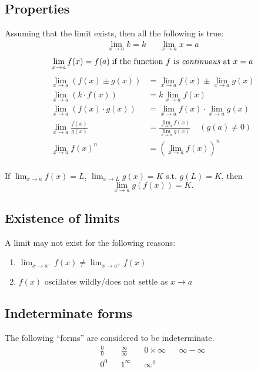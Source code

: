 \documentclass[main.tex]{subfiles}
\begin{document}
\begin{multicols}{2}
	\subsection*{Properties}
	Assuming that the limit exists, then all the following is true:
	\begin{align*}
		\lim_{x \to a} k = k && \lim_{x \to a} x = a
	\end{align*}
	\begin{equation*}
		\lim_{x \to a} f(x) = f(a) \; \text{if the function \(f\) is \emph{continuous} at \(x = a\)}
	\end{equation*}
	\begin{align*}
		\lim_{x \to a}(f(x) \pm g(x)) &= \lim_{x \to a}f(x) \pm \lim_{x \to a}g(x) \\
		\lim_{x \to a}(k \cdot f(x)) &= k \lim_{x \to a}f(x) \\
		\lim_{x \to a}(f(x) \cdot g(x)) &= \lim_{x \to a}{f(x)} \cdot \lim_{x \to a}{g(x)} \\
		\lim_{x \to a} \frac{f(x)}{g(x)} &= \frac{\lim_{x \to a} f(x)}{\lim_{x \to a} g(x)} \;\;\;\; (g(a) \neq 0) \\
		\lim_{x \to a}f(x)^n &= \left( \lim_{x \to a}{f(x)}\right)^n \\
	\end{align*}

	If \(\displaystyle \lim_{x \to a} f(x) = L\), \(\displaystyle \lim_{x \to L} g(x) = K\) s.t. \(g(L) = K\), then
	\begin{equation*}
		\lim_{x \to a} g(f(x)) = K.
	\end{equation*}


	\subsection*{Existence of limits}
	A limit may not exist for the following reasons:
	\begin{enumerate}
		\item \(\lim_{x \to a^{-}}{f(x)} \neq \lim_{x \to a^{+}}{f(x)}\)
		\item \(f(x)\) oscillates wildly/does not settle as \(x \to a\)
	\end{enumerate}

	\subsection*{Indeterminate forms}
	The following ``forms'' are considered to be indeterminate.
	\begin{align*}
		\frac{0}{0} && \frac{\infty}{\infty} && 0 \times \infty && \infty - \infty\\
		0^0 && 1^\infty && \infty^0
	\end{align*}


\end{multicols}
\end{document}
